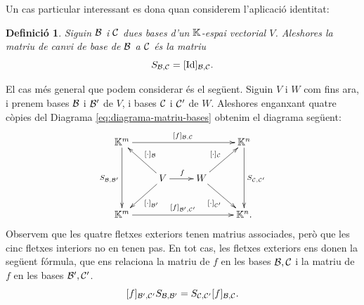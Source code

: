 \documentclass[
  11pt,
]{book}
\numberwithin{dummy}{section}
\theoremstyle{maincolornumbox}
\theoremstyle{blacknumex}
\theoremstyle{blacknumbox}
\newtheorem{definitionT}{Definició}[chapter]
\theoremstyle{maincolornum}
\newenvironment{definition}{\begin{dBox}\begin{definitionT}}{\end{definitionT}\end{dBox}}
\newlength\esp
\begin{document}
Un cas particular interessant es dona quan considerem l'aplicació
identitat:

\begin{definition}
Siguin \(\mathcal{B}\) i \(\mathcal{C}\) dues bases d'un \(\mathbb{K}\)-espai vectorial \(V\).
Aleshores la \emph{matriu de canvi de base} de \(\mathcal{B}\) a \(\mathcal{C}\) és la matriu
\[S_{\mathcal{B},\mathcal{C}} = [\operatorname{Id}]_{\mathcal{B},\mathcal{C}}.\]
\end{definition}

El cas més general que podem considerar és el següent. Siguin \(V\) i \(W\)
com fins ara, i prenem bases \(\mathcal{B}\) i \(\mathcal{B}'\) de \(V\), i bases \(\mathcal{C}\)
i \(\mathcal{C}'\) de \(W\). Aleshores enganxant quatre còpies del
Diagrama \eqref{eq:diagrama-matriu-bases} obtenim el diagrama següent:
\[
\xymatrix{
\K^m\ar[rrr]^{[f]_{\calb,\calc}}\ar[dd]_{S_{\calb,\calb'}}&&& \K^n\ar[dd]^{S_{\calc,\calc'}}\\
&V\ar[r]^f\ar[ul]_{[\cdot]_\calb}\ar[dl]^{[\cdot]_{\calb'}}&W\ar[ur]^{[\cdot]_{\calc}}\ar[dr]_{[\cdot]_{\calc'}}\\
\K^m\ar[rrr]^{[f]_{\calb',\calc'}}&&&\K^n.
}
\]
Observem que les quatre fletxes exteriors tenen matrius associades,
però que les cinc fletxes interiors no en tenen pas. En tot cas, les
fletxes exteriors ens donen la següent fórmula, que ens relaciona la
matriu de \(f\) en les bases \(\mathcal{B},\mathcal{C}\) i la matriu de \(f\) en les bases
\(\mathcal{B}',\mathcal{C}'\).
\[[f]_{\mathcal{B}',\mathcal{C}'} S_{\mathcal{B},\mathcal{B}'} = S_{\mathcal{C},\mathcal{C}'} [f]_{\mathcal{B},\mathcal{C}}.\]
\end{document}
